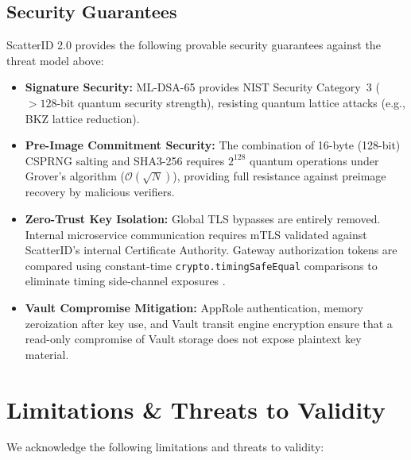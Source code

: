 \documentclass[5p,times,authoryear]{elsarticle}
\begin{document}
\subsection{Security Guarantees}
ScatterID 2.0 provides the following provable security guarantees against the threat model above:
\begin{itemize}[leftmargin=*]
\item \textbf{Signature Security:} ML-DSA-65 provides NIST Security Category~3 ($>128$-bit quantum security strength), resisting quantum lattice attacks (e.g., BKZ lattice reduction).
\item \textbf{Pre-Image Commitment Security:} The combination of 16-byte (128-bit) CSPRNG salting and SHA3-256 requires $2^{128}$ quantum operations under Grover's algorithm ($\mathcal{O}(\sqrt{N})$), providing full resistance against preimage recovery by malicious verifiers.
\item \textbf{Zero-Trust Key Isolation:} Global TLS bypasses are entirely removed. Internal microservice communication requires mTLS validated against ScatterID's internal Certificate Authority. Gateway authorization tokens are compared using constant-time \texttt{crypto.timingSafeEqual} comparisons \cite{nodejs_timingsafe, kocher1996timing} to eliminate timing side-channel exposures \cite{shams2026security}.
\item \textbf{Vault Compromise Mitigation:} AppRole authentication, memory zeroization after key use, and Vault transit engine encryption ensure that a read-only compromise of Vault storage does not expose plaintext key material.
\end{itemize}

\section{Limitations \& Threats to Validity}
\label{sec:limitations}
We acknowledge the following limitations and threats to validity:
\end{document}

